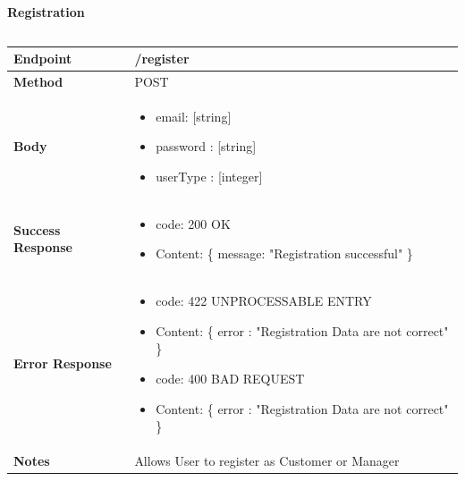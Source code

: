 \documentclass[a4paper, 12pt, oneside, table]{article}
\begin{document}
\textbf{Registration}
\vspace{-2em}
\begin{tabularx}{0.8\textwidth} { 
  | >{\raggedright\arraybackslash}X 
  | >{\centering\arraybackslash}X 
  | >{\raggedleft\arraybackslash}X | }
 \hline

 \hline
 
\hline
\hline
 
\hline
\end{tabularx}

\begin{tabularx}{\linewidth}{| l | X |}
    
    \hline
     \textbf{Endpoint} & /register \\
    

    \hline
    \textbf{Method}  & POST   \\
    
    \hline
    \textbf{Body}  & \parbox{0.7\textwidth}{ \begin{itemize}[label={}] 
                \item email: [string]
                 \item password : [string]
                 \item userType : [integer]
               \end{itemize}}\\
    
    \hline
    \textbf{Success Response} & \parbox{0.7\textwidth}{ \begin{itemize}[label={}] 
                \item code: 200 OK
                 \item Content: \{ message: "Registration successful" \}
               \end{itemize}}\\
    
    \hline
    
    \hline
        \textbf{Error Response} & \parbox{0.7\textwidth}{ \begin{itemize}[label={}] 
                \item code: 422 UNPROCESSABLE ENTRY
                 \item Content: \{ error : "Registration Data are not correct" \}
                 \item code: 400 BAD REQUEST
                 \item Content: \{ error : "Registration Data are not correct" \}
               \end{itemize}}\\
    
    \hline
    \textbf{Notes} & Allows User to register as Customer or Manager \\

    \hline
    
\end{tabularx}
\end{document}
